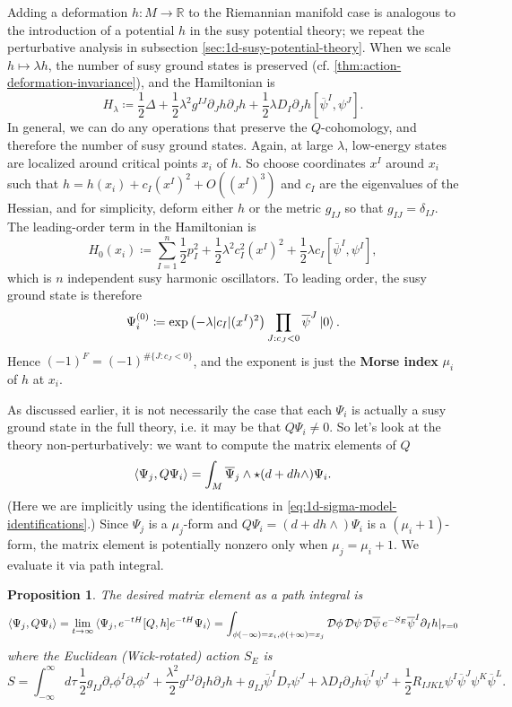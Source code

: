 \documentclass{report}
\theoremstyle{plain}
\newtheorem{proposition}[theorem]{Proposition}
\theoremstyle{definition}
\theoremstyle{remark}
\newcommand{\di}{\partial}
\newcommand{\bR}{\mathbb{R}}
\newcommand{\cD}{\mathcal{D}}
\newcommand{\cnj}{\overline}
\begin{document}
Adding a deformation $h\colon M \to \bR$ to the Riemannian manifold
case is analogous to the introduction of a potential $h$ in the susy
potential theory; we repeat the perturbative analysis in subsection
\ref{sec:1d-susy-potential-theory}. When we scale $h \mapsto \lambda
h$, the number of susy ground states is preserved (cf.
\ref{thm:action-deformation-invariance}), and the Hamiltonian is
\[ H_\lambda \coloneqq \frac{1}{2} \Delta + \frac{1}{2} \lambda^2 g^{IJ} \di_J h \di_J h + \frac{1}{2} \lambda D_I \di_J h[\cnj\psi^I, \psi^J]. \]
In general, we can do any operations that preserve the $Q$-cohomology,
and therefore the number of susy ground states. Again, at large
$\lambda$, low-energy states are localized around critical points
$x_i$ of $h$. So choose coordinates $x^I$ around $x_i$ such that $h =
h(x_i) + c_I (x^I)^2 + O((x^I)^3)$ and $c_I$ are the eigenvalues of
the Hessian, and for simplicity, deform either $h$ or the metric
$g_{IJ}$ so that $g_{IJ} = \delta_{IJ}$. The leading-order term in the
Hamiltonian is
\[ H_0(x_i) \coloneqq \sum_{I=1}^n \frac{1}{2} p_I^2 + \frac{1}{2} \lambda^2 c_I^2 (x^I)^2 + \frac{1}{2} \lambda c_I [\cnj\psi^I, \psi^I], \]
which is $n$ independent susy harmonic oscillators. To leading order,
the susy ground state is therefore
\begin{equation} \label{eq:1d-critical-point-susy-ground-state}
  \Psi_i^{(0)} \coloneqq \exp\left(-\lambda |c_I| (x^I)^2\right) \prod_{J : c_J < 0} \cnj\psi^J \ket{0}.
\end{equation}
Hence $(-1)^F = (-1)^{\#\{J: c_J < 0\}}$, and the exponent is just the
{\bf Morse index} $\mu_i$ of $h$ at $x_i$.

As discussed earlier, it is not necessarily the case that each
$\Psi_i$ is actually a susy ground state in the full theory, i.e. it
may be that $Q \Psi_i \neq 0$. So let's look at the theory
non-perturbatively: we want to compute the matrix elements of $Q$
\[ \braket{\Psi_j, Q\Psi_i} = \int_M \cnj\Psi_j \wedge \star(d + dh \wedge) \Psi_i. \]
(Here we are implicitly using the identifications in
\eqref{eq:1d-sigma-model-identifications}.) Since $\Psi_j$ is a
$\mu_j$-form and $Q\Psi_i = (d + dh \wedge)\Psi_i$ is a
$(\mu_i+1)$-form, the matrix element is potentially nonzero only when
$\mu_j = \mu_i+1$. We evaluate it via path integral.

\begin{proposition}
  The desired matrix element as a path integral is
  \[ \braket{\Psi_j, Q\Psi_i} = \lim_{t \to \infty} \braket{\Psi_j, e^{-tH}[Q, h]e^{-tH}\Psi_i} = \int_{\phi(-\infty)=x_i, \phi(+\infty)=x_j} \cD\phi \, \cD\psi\, \cD\cnj\psi \, e^{-S_E} \cnj\psi^I \di_I h|_{\tau=0} \]
  where the Euclidean (Wick-rotated) action $S_E$ is
  \[ S = \int_{-\infty}^\infty d\tau \, \frac{1}{2} g_{IJ} \di_\tau \phi^I \di_\tau \phi^J + \frac{\lambda^2}{2} g^{IJ} \di_Ih \di_Jh + g_{IJ}\cnj\psi^I D_\tau \psi^J + \lambda D_I \di_J h \cnj\psi^I\psi^J + \frac{1}{2} R_{IJKL} \psi^I\cnj\psi^J\psi^K\cnj\psi^L. \]
\end{proposition}
\end{document}

